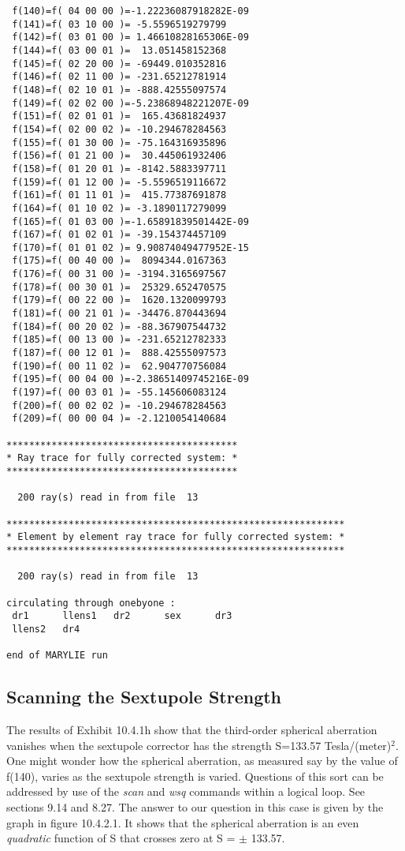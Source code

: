 \begin{footnotesize}
\begin{verbatim}
 f(140)=f( 04 00 00 )=-1.22236087918282E-09
 f(141)=f( 03 10 00 )= -5.5596519279799
 f(142)=f( 03 01 00 )= 1.46610828165306E-09
 f(144)=f( 03 00 01 )=  13.051458152368
 f(145)=f( 02 20 00 )= -69449.010352816
 f(146)=f( 02 11 00 )= -231.65212781914
 f(148)=f( 02 10 01 )= -888.42555097574
 f(149)=f( 02 02 00 )=-5.23868948221207E-09
 f(151)=f( 02 01 01 )=  165.43681824937
 f(154)=f( 02 00 02 )= -10.294678284563
 f(155)=f( 01 30 00 )= -75.164316935896
 f(156)=f( 01 21 00 )=  30.445061932406
 f(158)=f( 01 20 01 )= -8142.5883397711
 f(159)=f( 01 12 00 )= -5.5596519116672
 f(161)=f( 01 11 01 )=  415.77387691878
 f(164)=f( 01 10 02 )= -3.1890117279099
 f(165)=f( 01 03 00 )=-1.65891839501442E-09
 f(167)=f( 01 02 01 )= -39.154374457109
 f(170)=f( 01 01 02 )= 9.90874049477952E-15
 f(175)=f( 00 40 00 )=  8094344.0167363
 f(176)=f( 00 31 00 )= -3194.3165697567
 f(178)=f( 00 30 01 )=  25329.652470575
 f(179)=f( 00 22 00 )=  1620.1320099793
 f(181)=f( 00 21 01 )= -34476.870443694
 f(184)=f( 00 20 02 )= -88.367907544732
 f(185)=f( 00 13 00 )= -231.65212782333
 f(187)=f( 00 12 01 )=  888.42555097573
 f(190)=f( 00 11 02 )=  62.904770756084
 f(195)=f( 00 04 00 )=-2.38651409745216E-09
 f(197)=f( 00 03 01 )= -55.145606083124
 f(200)=f( 00 02 02 )= -10.294678284563
 f(209)=f( 00 00 04 )= -2.1210054140684

*****************************************
* Ray trace for fully corrected system: *
*****************************************

  200 ray(s) read in from file  13

************************************************************
* Element by element ray trace for fully corrected system: *
************************************************************

  200 ray(s) read in from file  13

circulating through onebyone :
 dr1      llens1   dr2      sex      dr3
 llens2   dr4

end of MARYLIE run
\end{verbatim}
\end{footnotesize}

\subsection{Scanning the Sextupole Strength}
\label{scanning}
The results of Exhibit 10.4.1h show that the third-order spherical
aberration vanishes when the sextupole corrector has the strength
S=133.57 Tesla/(meter)$^2$.  One might wonder how the spherical
aberration, as measured say by the value of f(140), varies as the
sextupole strength is varied.  Questions of this sort can be addressed by
use of the {\em scan} and {\em wsq} commands within a logical loop.  See
sections 9.14 and 8.27.  The answer to our question in this case is given
by the graph in figure 10.4.2.1.  It shows that the spherical aberration is
an even {\em quadratic} function of S that crosses zero at S = $\pm$
133.57.

